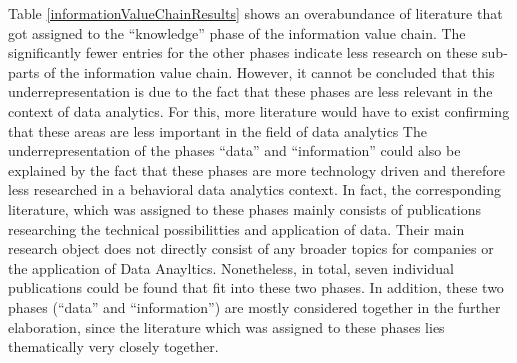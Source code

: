Table \ref{informationValueChainResults} shows an overabundance of literature that got assigned to the \enquote{knowledge} phase of the information value chain. %
The significantly fewer entries for the other phases indicate less research on these sub-parts of the information value chain. However, it cannot be concluded that this underrepresentation is due to the fact that these phases are less relevant in the context of data analytics. For this, more literature would have to exist confirming that these areas are less important in the field of data analytics %
The underrepresentation of the phases \enquote{data} and \enquote{information} could also be explained by the fact that these phases are more technology driven and therefore less researched in a behavioral data analytics context. In fact, the corresponding literature, which was assigned to these phases mainly consists of publications researching the technical possibilitties and application of data. Their main research object does not directly consist of any broader topics for companies or the application of Data Anayltics.
Nonetheless, in total, seven individual publications could be found that fit into these two phases. In addition, these two phases (\enquote{data} and \enquote{information}) are mostly considered together in the further elaboration, since the literature which was assigned to these phases lies thematically very closely together. 

